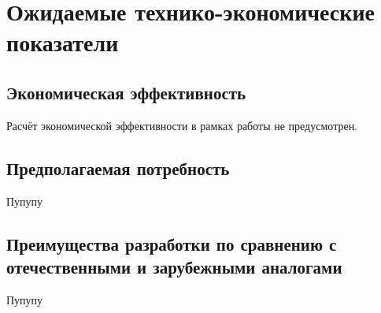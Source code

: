 \section{Ожидаемые технико-экономические показатели}

\subsection{Экономическая эффективность}

Расчёт экономической эффективности в рамках работы не предусмотрен.

\subsection{Предполагаемая потребность}

Пупупу

\subsection{Преимущества разработки по сравнению с отечественными и зарубежными аналогами}

Пупупу